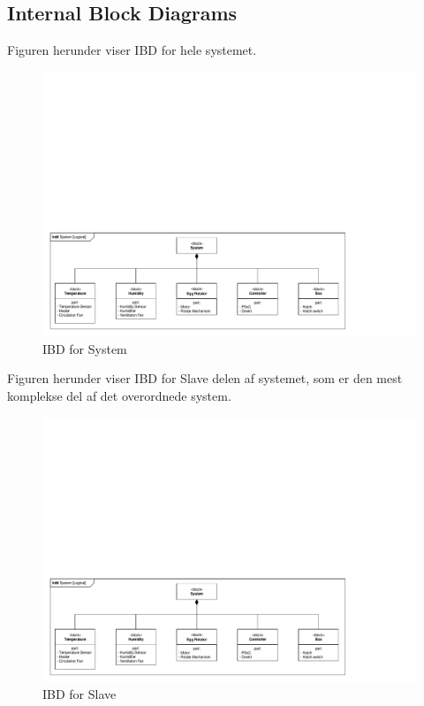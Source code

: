 
\subsection{Internal Block Diagrams}


Figuren herunder viser IBD for hele systemet.
\begin{figure}[H]
\centering
\includegraphics[page=4,width=\linewidth,viewport=8mm 8mm 145mm 58mm]{./2_systemarkitektur/diagrammer/SYSML_Diagrammer_v4.pdf}
\caption[Diagram]{IBD for System}
\label{fig:InternalBlockDiagramFysisk}
\end{figure}


Figuren herunder viser IBD for Slave delen af systemet, som er den mest komplekse del af det overordnede system.
\begin{figure}[H]
\centering
\includegraphics[page=3,width=\linewidth,viewport=8mm 8mm 265mm 212mm]{./2_systemarkitektur/diagrammer/SYSML_Diagrammer_v4.pdf}
\caption[Diagram]{IBD for Slave}
\label{fig:InternalBlockDiagramSlave}
\end{figure}

\clearpage